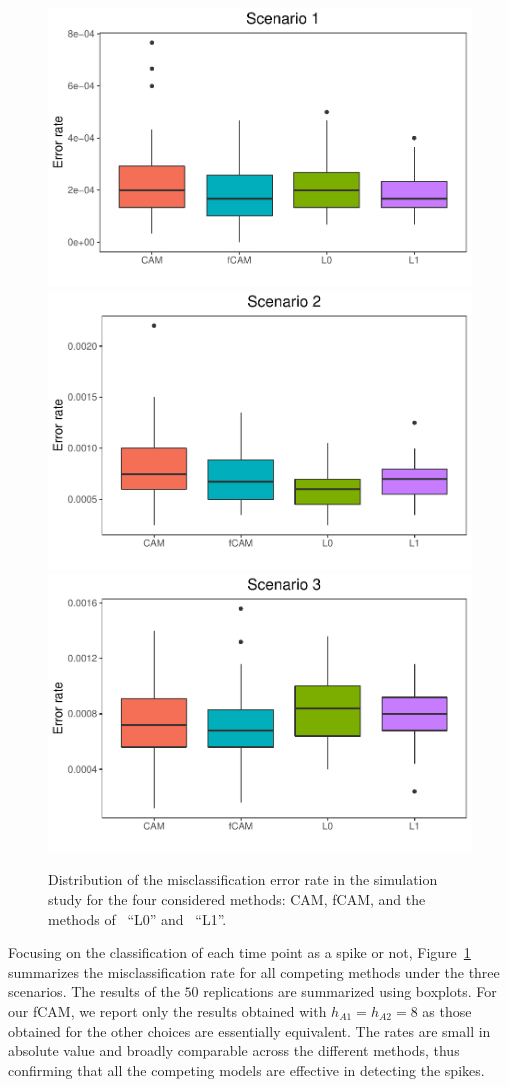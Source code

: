 \begin{figure}
	\centering
		\includegraphics[width = .6\textwidth]{_Images/ch3_err_rate1.pdf}\\
%
		\includegraphics[width = .6\textwidth]{_Images/ch3_err_rate2.pdf}\\
%
		\includegraphics[width = .6\textwidth]{_Images/ch3_err_rate3.pdf}\\
	\caption[Comparison between the misclassification error rate in the simulation study for the four considered methods.]{Distribution of the misclassification error rate in the simulation study for the four considered methods: CAM, fCAM, and the methods of~\textcite{jewell2019} ``L0'' and~\textcite{friedrich2017} ``L1''.}
	\label{fig:boxplots_rates}
\end{figure}



Focusing on the classification of each time point as a spike or not, Figure~\ref{fig:boxplots_rates} summarizes the misclassification rate for all competing methods under the three scenarios. The results of the $50$ replications are summarized using boxplots. For our fCAM, we report only the results obtained with $h_{A1} = h_{A2} = 8$ as those obtained for the other choices are essentially equivalent.  The rates are small in absolute value and broadly comparable across the different methods, thus confirming that all the competing models are effective in detecting the spikes.  

